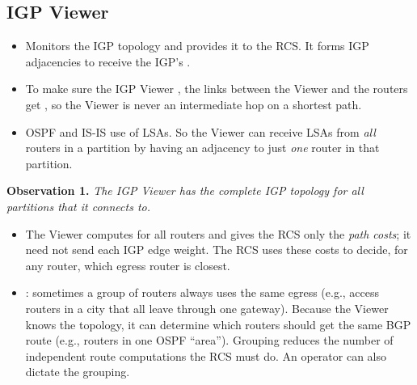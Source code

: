 \subsection{IGP Viewer}
\begin{itemize}
\item Monitors the IGP topology and provides it to the RCS. It forms IGP adjacencies to receive the IGP's .
\item To make sure the IGP Viewer , the links between the Viewer and the routers get , so the Viewer is never an intermediate hop on a shortest path.
\item OSPF and IS-IS use  of LSAs. So the Viewer can receive LSAs from \emph{all} routers in a partition by having an adjacency to just \emph{one} router in that partition.
\end{itemize}
\textbf{Observation 1.} \emph{The IGP Viewer has the complete IGP topology for all partitions that it connects to.}
\begin{itemize}
\item The Viewer computes  for all routers and gives the RCS only the \emph{path costs}; it need not send each IGP edge weight. The RCS uses these costs to decide, for any router, which egress router is closest.
\item {}: sometimes a group of routers always uses the same egress (e.g., access routers in a city that all leave through one gateway). Because the Viewer knows the topology, it can determine which routers should get the same BGP route (e.g., routers in one OSPF ``area''). Grouping reduces the number of independent route computations the RCS must do. An operator can also dictate the grouping.
\end{itemize}

